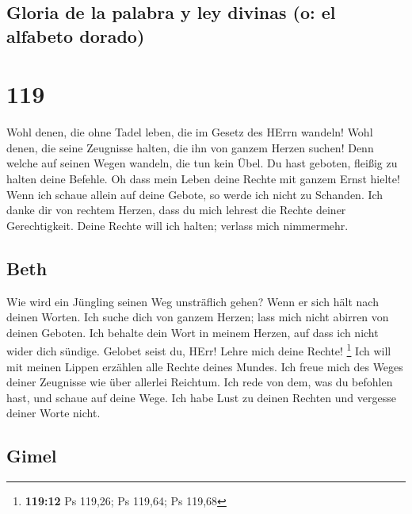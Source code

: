 \hypertarget{gloria-de-la-palabra-y-ley-divinas-o-el-alfabeto-dorado}{%
\subsection{Gloria de la palabra y ley divinas (o: el alfabeto
dorado)}\label{gloria-de-la-palabra-y-ley-divinas-o-el-alfabeto-dorado}}

\hypertarget{section-118}{%
\section{119}\label{section-118}}

 Wohl denen, die ohne Tadel leben, die im Gesetz des HErrn
wandeln!  Wohl denen, die seine Zeugnisse halten, die ihn
von ganzem Herzen suchen!  Denn welche auf seinen Wegen
wandeln, die tun kein Übel.  Du hast geboten, fleißig zu
halten deine Befehle.  Oh dass mein Leben deine Rechte mit
ganzem Ernst hielte!  Wenn ich schaue allein auf deine
Gebote, so werde ich nicht zu Schanden.  Ich danke dir von
rechtem Herzen, dass du mich lehrest die Rechte deiner Gerechtigkeit.
 Deine Rechte will ich halten; verlass mich nimmermehr.

\hypertarget{beth}{%
\subsection{Beth}\label{beth}}

 Wie wird ein Jüngling seinen Weg unsträflich gehen? Wenn
er sich hält nach deinen Worten.  Ich suche dich von
ganzem Herzen; lass mich nicht abirren von deinen Geboten.
 Ich behalte dein Wort in meinem Herzen, auf dass ich
nicht wider dich sündige.  Gelobet seist du, HErr! Lehre
mich deine Rechte! \footnote{\textbf{119:12} Ps 119,26; Ps 119,64; Ps
  119,68}  Ich will mit meinen Lippen erzählen alle
Rechte deines Mundes.  Ich freue mich des Weges deiner
Zeugnisse wie über allerlei Reichtum.  Ich rede von dem,
was du befohlen hast, und schaue auf deine Wege.  Ich
habe Lust zu deinen Rechten und vergesse deiner Worte nicht.

\hypertarget{gimel}{%
\subsection{Gimel}\label{gimel}}

